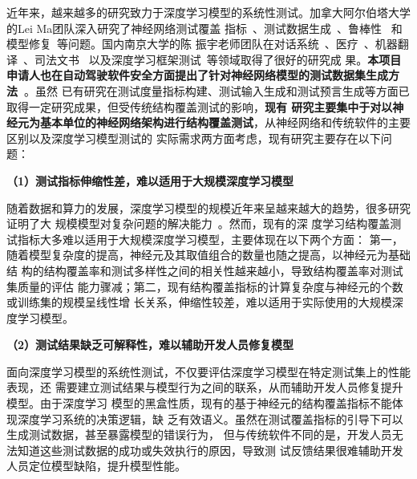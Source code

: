 



近年来，越来越多的研究致力于深度学习模型的系统性测试。加拿大阿尔伯塔大学的Lei Ma团队深入研究了神经网络测试覆盖
指标~\cite{ma2018deepgauge,ma2019deepct}、测试数据生成~\cite{xie2019coverage,xie2019deephunter}、鲁棒性
~\cite{wang2020deepsonar,sun2020stealthy,zhang2020generating}和模型修复~\cite{yu2021deeprepair}等问题。国内南京大学的陈
振宇老师团队在对话系统~\cite{liu2021dialtest}、医疗~\cite{hou2021taumed}、机器翻译~\cite{ji2021automated}、司法文书
~\cite{guo2020taujud}以及深度学习框架测试~\cite{zhang2021duo,zhang2021predoo,luo2021graph}等领域取得了很好的研究成
果。\textbf{本项目申请人也在自动驾驶软件安全方面提出了针对神经网络模型的测试数据集生成方法~\cite{xu2021deepsuite}}。虽然
已有研究在测试度量指标构建、测试输入生成和测试预言生成等方面已取得一定研究成果，但受传统结构覆盖测试的影响，\textbf{现有
    研究主要集中于对以神经元为基本单位的神经网络架构进行结构覆盖测试}，从神经网络和传统软件的主要区别以及深度学习模型测试的
实际需求两方面考虑，现有研究主要存在以下问题：

\textbf{（1）测试指标伸缩性差，难以适用于大规模深度学习模型}

随着数据和算力的发展，深度学习模型的规模近年来呈越来越大的趋势，很多研究证明了大
规模模型对复杂问题的解决能力~\cite{kenton2019bert,he2021masked}。然而，现有的深
度学习结构覆盖测试指标大多难以适用于大规模深度学习模型，主要体现在以下两个方面：
第一，随着模型复杂度的提高，神经元及其取值组合的数量也随之提高，以神经元为基础结
构的结构覆盖率和测试多样性之间的相关性越来越小，导致结构覆盖率对测试集质量的评估
能力骤减；第二，现有结构覆盖指标的计算复杂度与神经元的个数或训练集的规模呈线性增
长关系，伸缩性较差，难以适用于实际使用的大规模深度学习模型。


\textbf{（2）测试结果缺乏可解释性，难以辅助开发人员修复模型}

面向深度学习模型的系统性测试，不仅要评估深度学习模型在特定测试集上的性能表现，还
需要建立测试结果与模型行为之间的联系，从而辅助开发人员修复提升模型。由于深度学习
模型的黑盒性质，现有的基于神经元的结构覆盖指标不能体现深度学习系统的决策逻辑，缺
乏有效语义。虽然在测试覆盖指标的引导下可以生成测试数据，甚至暴露模型的错误行为，
但与传统软件不同的是，开发人员无法知道这些测试数据的成功或失效执行的原因，导致测
试反馈结果很难辅助开发人员定位模型缺陷，提升模型性能。

